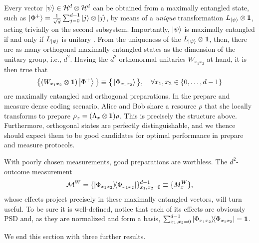     Every vector $\ket{\psi} \in \mathcal{H}^{d} \otimes \mathcal{H}^{d}$ can be obtained from a maximally entangled state, such as $\ket{\Phi^+} = \frac{1}{\sqrt{d}} \sum_{j=0}^{d-1} \ket{j} \otimes \ket{j}$, by means of a \emph{unique} transformation $L_{\ket{\psi}} \otimes \mathbf{1}$, acting trivially on the second subsystem. Importantly, $\ket{\psi}$ is maximally entangled if and only if $L_{\ket{\psi}}$ is unitary \cite{vollbrecht_twoqubits_2000}. From the uniqueness of the $L_{\ket{\psi}} \otimes \mathbf{1}$, then, there are as many orthogonal maximally entangled states as the dimension of the unitary group, i.e., $d^2$. Having the $d^2$ orthonormal unitaries $W_{x_1 x_2}$ at hand, it is then true that
    \begin{equation}
        \big\{ (W_{x_1 x_2} \otimes \mathbf{1}) \ket{\Phi^+} \big\} \equiv \big\{ \ket{\Phi_{x_1 x_2}} \big\}, \quad \forall x_1, x_2 \in \{0, \ldots, d-1\}
        \label{eq:weyl-states}
    \end{equation}
    are maximally entangled and orthogonal preparations. In the prepare and measure dense coding scenario, Alice and Bob share a resource $\rho$ that she locally transforms to prepare $\rho_x = (\Lambda_x \otimes \mathbf{1}) \rho$. This is precisely the structure above. Furthermore, orthogonal states are perfectly distinguishable, and we thence should expect them to be good candidates for optimal performance in prepare and measure protocols.

    With poorly chosen measurements, good preparations are worthless. The $d^2$-outcome measurement
    \begin{equation}
        \mathcal{M}^W = \{ \ketbra{\Phi_{x_1 x_2}}{\Phi_{x_1 x_2}} \}_{x_1, x_2 = 0}^{d-1} \equiv \{ M_x^W \},
        \label{eq:weyl-measurements}
    \end{equation}
    whose effects project precisely in these maximally entangled vectors, will turn useful. To be sure it is well-defined, notice that each of its effects are obviously PSD and, as they are normalized and form a basis, $\sum_{x_1, x_2 = 0}^{d - 1} \ketbra{\Phi_{x_1 x_2}}{\Phi_{x_1 x_2}} = \mathbf{1}$.

    \ornamentbreak
    We end this section with three further results.

